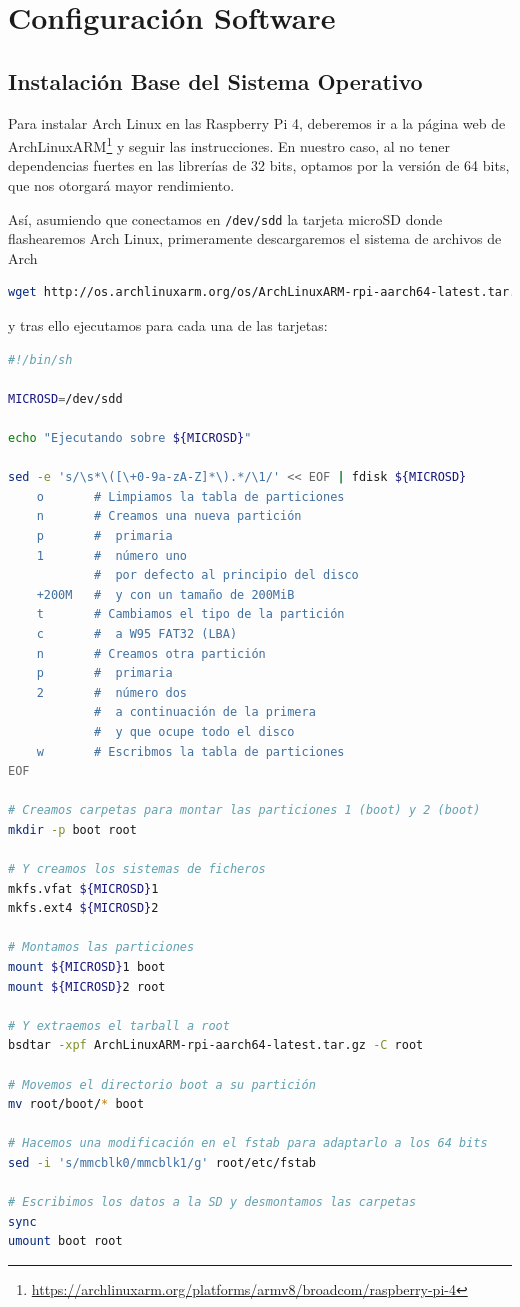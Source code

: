 \section{Configuración Software}
\label{sec:impl_infra_software}

\subsection{Instalación Base del Sistema Operativo}
\label{ssec:instalacion_sistema_operativo}
Para instalar Arch Linux en las Raspberry Pi 4, deberemos ir a la página web de ArchLinuxARM\footnote{\url{https://archlinuxarm.org/platforms/armv8/broadcom/raspberry-pi-4}} y seguir las instrucciones. En nuestro caso, al no tener dependencias fuertes en las librerías de 32 bits, optamos por la versión de 64 bits, que nos otorgará mayor rendimiento.

Así, asumiendo que conectamos en \texttt{/dev/sdd} la tarjeta microSD donde flashearemos Arch Linux, primeramente descargaremos el sistema de archivos de Arch

\begin{lstlisting}[language=bash,basicstyle=\scriptsize]
wget http://os.archlinuxarm.org/os/ArchLinuxARM-rpi-aarch64-latest.tar.gz
\end{lstlisting}

y tras ello ejecutamos para cada una de las tarjetas:

\begin{lstlisting}[language=bash]
#!/bin/sh

MICROSD=/dev/sdd

echo "Ejecutando sobre ${MICROSD}"

sed -e 's/\s*\([\+0-9a-zA-Z]*\).*/\1/' << EOF | fdisk ${MICROSD}
    o       # Limpiamos la tabla de particiones
    n       # Creamos una nueva partición
    p       #  primaria
    1       #  número uno
            #  por defecto al principio del disco
    +200M   #  y con un tamaño de 200MiB
    t       # Cambiamos el tipo de la partición
    c       #  a W95 FAT32 (LBA)
    n       # Creamos otra partición
    p       #  primaria
    2       #  número dos
            #  a continuación de la primera
            #  y que ocupe todo el disco
    w       # Escribmos la tabla de particiones
EOF

# Creamos carpetas para montar las particiones 1 (boot) y 2 (boot)
mkdir -p boot root

# Y creamos los sistemas de ficheros
mkfs.vfat ${MICROSD}1
mkfs.ext4 ${MICROSD}2

# Montamos las particiones
mount ${MICROSD}1 boot
mount ${MICROSD}2 root

# Y extraemos el tarball a root
bsdtar -xpf ArchLinuxARM-rpi-aarch64-latest.tar.gz -C root

# Movemos el directorio boot a su partición
mv root/boot/* boot

# Hacemos una modificación en el fstab para adaptarlo a los 64 bits
sed -i 's/mmcblk0/mmcblk1/g' root/etc/fstab

# Escribimos los datos a la SD y desmontamos las carpetas
sync
umount boot root
\end{lstlisting}

